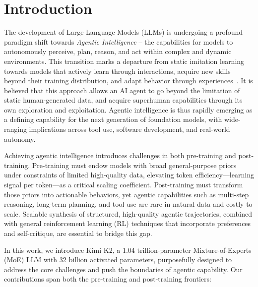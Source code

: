 \section{Introduction}



The development of Large Language Models (LLMs) is undergoing a profound paradigm shift towards \textit{Agentic Intelligence} -- the capabilities for models to autonomously perceive, plan, reason, and act within complex and dynamic environments. This transition marks a departure from static imitation learning towards models that actively learn through interactions, acquire new skills beyond their training distribution, and adapt behavior through experiences~\citep{silver2025welcome}. It is believed that this approach allows an AI agent to go beyond the limitation of static human-generated data, and acquire superhuman capabilities through its own exploration and exploitation. Agentic intelligence is thus rapidly emerging as a defining capability for the next generation of foundation models, with wide-ranging implications across tool use, software development, and real-world autonomy.




Achieving agentic intelligence introduces  challenges in both pre-training and post-training. Pre-training must endow models with broad general-purpose priors under constraints of limited high-quality data, elevating token efficiency—learning signal per token—as a critical scaling coefficient. Post-training must transform those priors into actionable behaviors, yet agentic capabilities such as multi-step reasoning, long-term planning, and tool use are rare in natural data and costly to scale. Scalable synthesis of structured, high-quality agentic trajectories, combined with general reinforcement learning (RL) techniques that incorporate preferences and self-critique, are essential to bridge this gap.


In this work, we introduce Kimi K2, a 1.04 trillion-parameter Mixture-of-Experts (MoE) LLM with 32 billion activated parameters, purposefully designed to address the core challenges and push the boundaries of agentic capability. Our contributions span both the pre-training and post-training frontiers:


